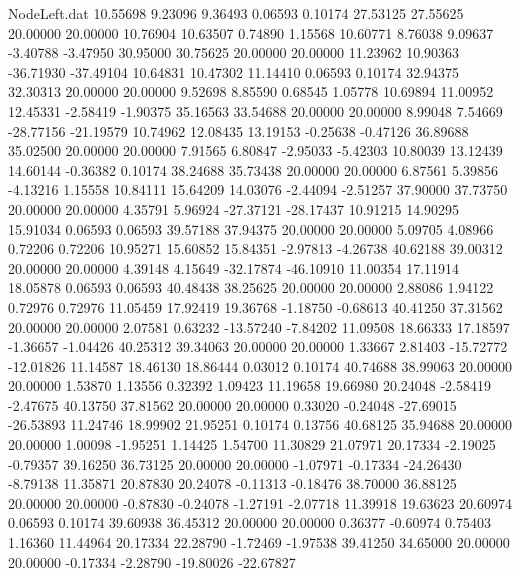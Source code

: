 \begin{filecontents}{NodeLeft.dat}
  10.55698    9.23096    9.36493     0.06593    0.10174   27.53125   27.55625   20.00000   20.00000   10.76904   10.63507    0.74890    1.15568
  10.60771    8.76038    9.09637    -3.40788   -3.47950   30.95000   30.75625   20.00000   20.00000   11.23962   10.90363  -36.71930  -37.49104
  10.64831   10.47302   11.14410     0.06593    0.10174   32.94375   32.30313   20.00000   20.00000    9.52698    8.85590    0.68545    1.05778
  10.69894   11.00952   12.45331    -2.58419   -1.90375   35.16563   33.54688   20.00000   20.00000    8.99048    7.54669  -28.77156  -21.19579
  10.74962   12.08435   13.19153    -0.25638   -0.47126   36.89688   35.02500   20.00000   20.00000    7.91565    6.80847   -2.95033   -5.42303
  10.80039   13.12439   14.60144    -0.36382    0.10174   38.24688   35.73438   20.00000   20.00000    6.87561    5.39856   -4.13216    1.15558
  10.84111   15.64209   14.03076    -2.44094   -2.51257   37.90000   37.73750   20.00000   20.00000    4.35791    5.96924  -27.37121  -28.17437
  10.91215   14.90295   15.91034     0.06593    0.06593   39.57188   37.94375   20.00000   20.00000    5.09705    4.08966    0.72206    0.72206
  10.95271   15.60852   15.84351    -2.97813   -4.26738   40.62188   39.00312   20.00000   20.00000    4.39148    4.15649  -32.17874  -46.10910
  11.00354   17.11914   18.05878     0.06593    0.06593   40.48438   38.25625   20.00000   20.00000    2.88086    1.94122    0.72976    0.72976
  11.05459   17.92419   19.36768    -1.18750   -0.68613   40.41250   37.31562   20.00000   20.00000    2.07581    0.63232  -13.57240   -7.84202
  11.09508   18.66333   17.18597    -1.36657   -1.04426   40.25312   39.34063   20.00000   20.00000    1.33667    2.81403  -15.72772  -12.01826
  11.14587   18.46130   18.86444     0.03012    0.10174   40.74688   38.99063   20.00000   20.00000    1.53870    1.13556    0.32392    1.09423
  11.19658   19.66980   20.24048    -2.58419   -2.47675   40.13750   37.81562   20.00000   20.00000    0.33020   -0.24048  -27.69015  -26.53893
  11.24746   18.99902   21.95251     0.10174    0.13756   40.68125   35.94688   20.00000   20.00000    1.00098   -1.95251    1.14425    1.54700
  11.30829   21.07971   20.17334    -2.19025   -0.79357   39.16250   36.73125   20.00000   20.00000   -1.07971   -0.17334  -24.26430   -8.79138
  11.35871   20.87830   20.24078    -0.11313   -0.18476   38.70000   36.88125   20.00000   20.00000   -0.87830   -0.24078   -1.27191   -2.07718
  11.39918   19.63623   20.60974     0.06593    0.10174   39.60938   36.45312   20.00000   20.00000    0.36377   -0.60974    0.75403    1.16360
  11.44964   20.17334   22.28790    -1.72469   -1.97538   39.41250   34.65000   20.00000   20.00000   -0.17334   -2.28790  -19.80026  -22.67827

\end{filecontents}
